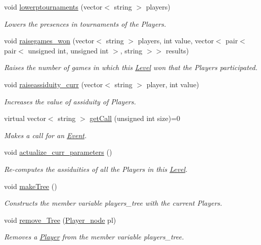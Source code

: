 \begin{DoxyCompactItemize}
void \hyperlink{class_level_afbb999a489e4e185bb26e965939a97e5}{lowerptournaments} (vector$<$ string $>$ players)
\begin{DoxyCompactList}\small\item\em Lowers the presences in tournaments of the Players. \end{DoxyCompactList}\item 
void \hyperlink{class_level_af91bf73255a171a3f2a256778e075fb7}{raisegames\+\_\+won} (vector$<$ string $>$ players, int value, vector$<$ pair$<$ pair$<$ unsigned int, unsigned int $>$, string $>$$>$ results)
\begin{DoxyCompactList}\small\item\em Raises the number of games in which this \hyperlink{class_level}{Level} won that the Players participated. \end{DoxyCompactList}\item 
void \hyperlink{class_level_a2634c6743f1a56592c97e6cfb7a9a8b6}{raiseassiduity\+\_\+curr} (vector$<$ string $>$ player, int value)
\begin{DoxyCompactList}\small\item\em Increases the value of assiduity of Players. \end{DoxyCompactList}\item 
virtual vector$<$ string $>$ \hyperlink{class_level_ac118b390f16a75b9a0e9df198b3190ad}{get\+Call} (unsigned int size)=0
\begin{DoxyCompactList}\small\item\em Makes a call for an \hyperlink{class_event}{Event}. \end{DoxyCompactList}\item 
void \hyperlink{class_level_a09a28b62e9b593db54b220533a5dd567}{actualize\+\_\+curr\+\_\+parameters} ()
\begin{DoxyCompactList}\small\item\em Re-\/computes the assiduities of all the Players in this \hyperlink{class_level}{Level}. \end{DoxyCompactList}\item 
void \hyperlink{class_level_a45217bde102ee160f4852d093f51ed83}{make\+Tree} ()
\begin{DoxyCompactList}\small\item\em Constructs the member variable players\+\_\+tree with the current Players. \end{DoxyCompactList}\item 
void \hyperlink{class_level_a2752e4f84d3de5e8b72e4cf87cb0131b}{remove\+\_\+\+Tree} (\hyperlink{struct_player__node}{Player\+\_\+node} pl)
\begin{DoxyCompactList}\small\item\em Removes a \hyperlink{class_player}{Player} from the member variable players\+\_\+tree. \end{DoxyCompactList}\end{DoxyCompactItemize}



